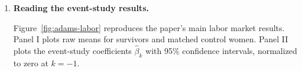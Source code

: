 \documentclass[12pt]{article}
\begin{document}
\begin{enumerate}
\begin{enumerate}
%
%
%
\vspace{4cm}

\item What does $\beta_3$ represent?
What would you expect the coefficients for
$k<0$ to look like if the design is credible?

\vspace{4cm}

\item Suppose the estimated coefficient three years
after the assault is $-1500$, with a standard error
of $500$. Interpret the coefficient and determine
whether it is statistically significant at the
5\% level.

%
%
\vspace{4cm}

\end{enumerate}

\vspace{1cm}

\item \textbf{Reading the event-study results.}

Figure~\ref{fig:adams-labor} reproduces the paper's main
labor market results. Panel I plots raw means for survivors
and matched control women. Panel II plots the event-study
coefficients $\hat\beta_k$ with 95\% confidence intervals,
normalized to zero at $k=-1$.


\end{enumerate}
\end{document}
